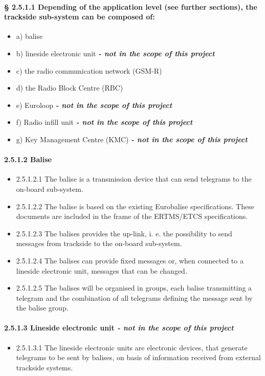 \paragraph{§ 2.5.1.1	Depending of the application level (see further sections), the trackside sub-system can be composed of:}
\begin{itemize}
\item a) balise
\item b) lineside electronic unit \textbf{\textit{- not in the scope of this project}}
\item c) the radio communication network (GSM-R)
\item d) the Radio Block Centre (RBC)
\item e) Euroloop \textbf{\textit{- not in the scope of this project}}
\item f) Radio infill unit \textbf{\textit{- not in the scope of this project}}
\item g) Key Management Centre (KMC) \textbf{\textit{- not in the scope of this project}}
\end{itemize}


\paragraph{2.5.1.2 Balise}
\begin{itemize}
\item 2.5.1.2.1	The balise is a transmission device that can send telegrams to the on-board sub-system.
\item 2.5.1.2.2	The balise is based on the existing Eurobalise specifications. These documents are included in the frame of the ERTMS/ETCS specifications.
\item 2.5.1.2.3	The balises provides the up-link, i. e. the possibility to send messages from trackside to the on-board sub-system.
\item 2.5.1.2.4	The balises can provide fixed messages or, when connected to a lineside electronic unit, messages that can be changed. 
\item 2.5.1.2.5	The balises will be organised in groups, each balise transmitting a telegram and the combination of all telegrams defining the message sent by the balise group.
\end{itemize}

\paragraph{2.5.1.3 Lineside electronic unit \textit{- not in the scope of this project}}
\begin{itemize}
\item 2.5.1.3.1	The lineside electronic units are electronic devices, that generate telegrams to be sent by balises, on basis of information received from external trackside systems.
\end{itemize}


